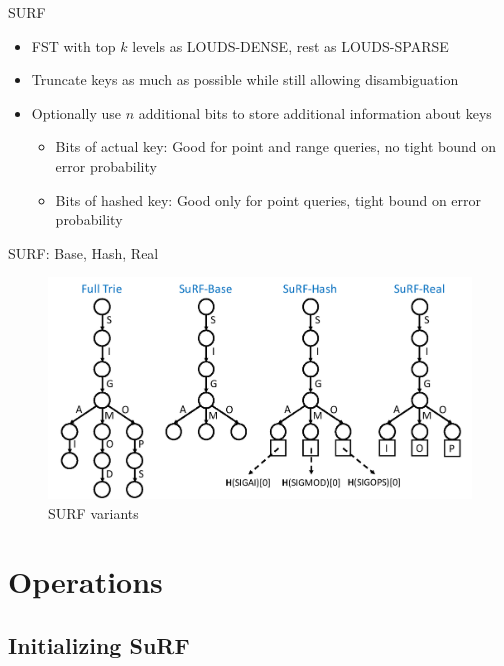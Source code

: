 \documentclass{beamer}
\begin{document}
\begin{frame}{SURF}
		\begin{itemize}
				\item FST with top $k$ levels as LOUDS-DENSE, rest as
						LOUDS-SPARSE
				\item Truncate keys as much as possible while still allowing
						disambiguation
				\item Optionally use $n$ additional bits to store additional
						information about keys
						\begin{itemize}
								\item Bits of actual key: Good for point and
										range queries, no tight bound on error
										probability
								\item Bits of hashed key: Good only for point
										queries, tight bound on error
										probability
						\end{itemize}
		\end{itemize}
\end{frame}

\begin{frame}{SURF: Base, Hash, Real}
		\begin{figure}
				\centering
				\includegraphics[width=\textwidth]{resources/surf}
				\caption{SURF variants \autocite{zhangSuRFPracticalRange2018}}
		\end{figure}
\end{frame}

\section{Operations}

\subsection{Initializing SuRF}
\end{document}
